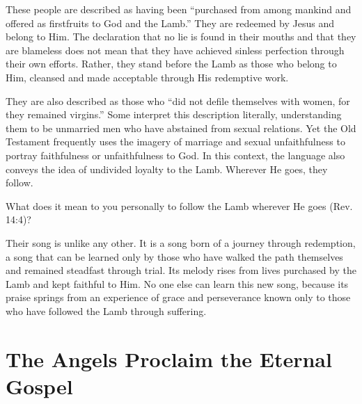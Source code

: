 
These people are described as having been “purchased from among mankind and offered as firstfruits to God and the Lamb.” They are redeemed by Jesus and belong to Him. The declaration that no lie is found in their mouths and that they are blameless does not mean that they have achieved sinless perfection through their own efforts. Rather, they stand before the Lamb as those who belong to Him, cleansed and made acceptable through His redemptive work.

They are also described as those who “did not defile themselves with women, for they remained virgins.” Some interpret this description literally, understanding them to be unmarried men who have abstained from sexual relations. Yet the Old Testament frequently uses the imagery of marriage and sexual unfaithfulness to portray faithfulness or unfaithfulness to God. In this context, the language also conveys the idea of undivided loyalty to the Lamb. Wherever He goes, they follow.

\begin{ReaderQuestion}
What does it mean to you personally to follow the Lamb wherever He goes (Rev. 14:4)?
\end{ReaderQuestion}

Their song is unlike any other. It is a song born of a journey through redemption, a song that can be learned only by those who have walked the path themselves and remained steadfast through trial. Its melody rises from lives purchased by the Lamb and kept faithful to Him. No one else can learn this new song, because its praise springs from an experience of grace and perseverance known only to those who have followed the Lamb through suffering.

\section{The Angels Proclaim the Eternal Gospel}

